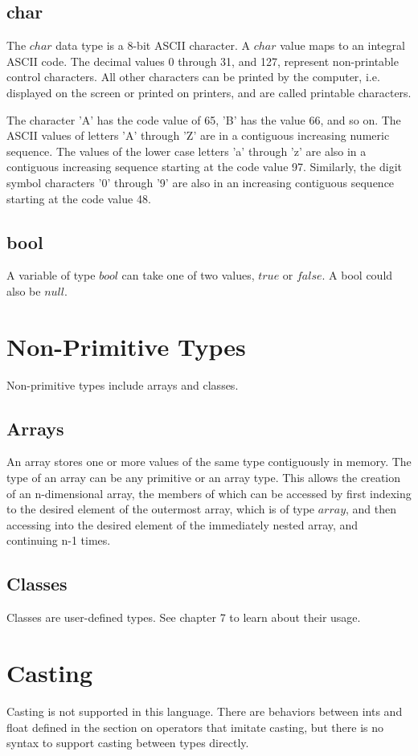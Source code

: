 \begin{homeworkProblem}
	\subsection{char}

	The $char$ data type is a 8-bit ASCII character. A $char$ value maps to an integral ASCII code. The decimal values 0 through 31, and 127, represent non-printable control characters. All other characters can be printed by the computer, i.e. displayed on the screen or printed on printers, and are called printable characters.

    The character 'A' has the code value of 65, 'B' has the value 66, and so on. The ASCII values of letters 'A' through 'Z' are in a contiguous increasing numeric sequence. The values of the lower case letters 'a' through 'z' are also in a contiguous increasing sequence starting at the code value 97. Similarly, the digit symbol characters '0' through '9' are also in an increasing contiguous sequence starting at the code value 48.

	\subsection{bool}

	A variable of type $bool$ can take one of two values, $true$ or $false$. A bool could also be $null$.\\

	\section{Non-Primitive Types}
    Non-primitive types include arrays and classes.
	\subsection{Arrays}
	An array stores one or more values of the same type contiguously in memory. The type of an array can be any primitive or an array type. This allows the creation of an n-dimensional array, the members of which can be accessed by first indexing to the desired element of the outermost array, which is of type $array$, and then accessing into the desired element of the immediately nested array, and continuing n-1 times.

	\subsection{Classes}
	
	Classes are user-defined types. See chapter 7 to learn about their usage.

	\section{Casting}
	Casting is not supported in this language. There are behaviors between ints and float defined in the section on operators that imitate casting, but there is no syntax to support casting between types directly. 

\end{homeworkProblem}
